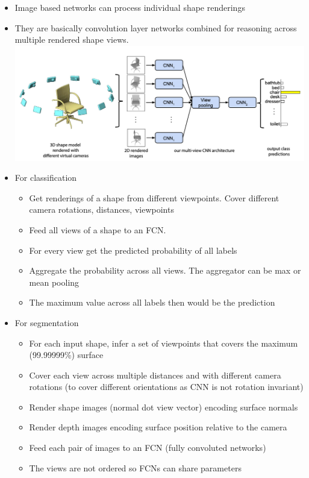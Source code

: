 \documentclass{article}
\theoremstyle{definition}
\theoremstyle{remark}
\begin{document}
\begin{itemize}
    \item Image based networks can process individual shape renderings
    \item They are basically convolution layer networks combined for reasoning across multiple rendered shape views.\\
    \includegraphics[width=5in]{img/mvn.png}
    \item For classification
    \begin{itemize}
        \item Get renderings of a shape from different viewpoints. Cover different camera rotations, distances, viewpoints
        \item Feed all views of a shape to an FCN.
        \item For every view get the predicted probability of all labels
        \item Aggregate the probability across all views. The aggregator can be max or mean pooling
        \item The maximum value across all labels then would be the prediction
    \end{itemize}
    \item For segmentation
    \begin{itemize}
        \item For each input shape, infer a set of viewpoints that covers the maximum (99.99999\%) surface
        \item Cover each view across multiple distances and with different camera rotations (to cover different orientations as CNN is not rotation invariant)
        \item Render shape images (normal dot view vector) encoding surface normals
        \item Render depth images encoding surface position relative to the camera
        \item Feed each pair of images to an FCN (fully convoluted networks)
        \item The views are not ordered so FCNs can share parameters

\end{itemize}
\end{itemize}
\end{document}
